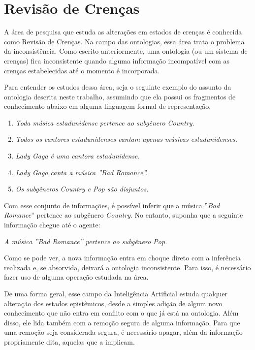 \chapter{Revisão de Crenças}
\label{chap:revisao}

\lettrine{A}{} área de pesquisa que estuda as alterações em estados de crenças é conhecida como Revisão de Crenças. Na campo das ontologias, essa área trata o problema da inconsistência. Como escrito anteriormente, uma ontologia (ou um sistema de crenças) fica inconsistente quando alguma informação incompatível com as crenças estabelecidas até o momento é incorporada.

Para entender os estudos dessa área, seja o seguinte exemplo do assunto da ontologia descrita neste trabalho, assumindo que ela possui os fragmentos de conhecimento abaixo em alguma linguagem formal de representação.

\begin{enumerate}
	\item \textit{Toda música estadunidense pertence ao subgênero \textit{Country}.}
	\item \textit{Todos os cantores estadunidenses cantam apenas músicas estadunidenses.}
	\item \textit{Lady Gaga é uma cantora estadunidense.}
	\item \textit{Lady Gaga canta a música ''\textit{Bad Romance}''.}
	\item \textit{Os subgêneros Country e Pop são disjuntos.}
\end{enumerate}

Com esse conjunto de informações, é possível inferir que a música ''\textit{Bad Romance}'' pertence ao subgênero \textit{Country}. No entanto, suponha que a seguinte informação chegue até o agente:

\begin{center}
	\textit{A música ''\textit{Bad Romance}'' pertence ao subgênero Pop.}
\end{center}

Como se pode ver, a nova informação entra em choque direto com a inferência realizada e, se absorvida, deixará a ontologia inconsistente. Para isso, é necessário fazer uso de alguma operação estudada na área.

De uma forma geral, esse campo da Inteligência Artificial estuda qualquer alteração dos estados epistêmicos, desde a simples adição de algum novo conhecimento que não entra em conflito com o que já está na ontologia. Além disso, ele lida também com a remoção segura de alguma informação. Para que uma remoção seja considerada segura, é necessário apagar, além da informação propriamente dita, aquelas que a implicam. 

